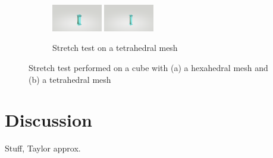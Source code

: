 \begin{figure}[!htbp]
\begin{subfigure}[b]{\textwidth}
        \hfill
        \includegraphics[width=0.24\textwidth]{resources/tetcli_step16.png}
        \hfill
        \includegraphics[width=0.24\textwidth]{resources/tetcli_step24.png}
        \caption{Stretch test on a tetrahedral mesh}
    \end{subfigure}
    \caption{Stretch test performed on a cube with (a) a hexahedral mesh and (b) a tetrahedral mesh}
    \label{fig:stretchtest}
\end{figure}





\section{Discussion}
Stuff, Taylor approx.


